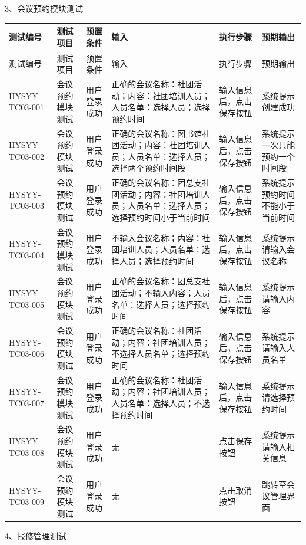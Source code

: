 \documentclass{izdthesis}
\begin{document}
3、会议预约模块测试

{\songti
\begin{longtable}{|p{2.3cm}|p{1.8cm}|p{1.9cm}|p{3.2cm}|p{2.1cm}|p{2.3cm}|}
  \hline
  测试编号 & 测试项目 & 预置条件 & 输入 & 执行步骤 & 预期输出 \\
  \hline
  \endfirsthead
  \hline
  测试编号 & 测试项目 & 预置条件 & 输入 & 执行步骤 & 预期输出 \\
  \hline
  \endhead
  HYSYY-TC03-001 & 会议预约模块测试 & 用户登录成功 & 正确的会议名称：社团活动；内容：社团培训人员；人员名单：选择人员；选择预约时间 & 输入信息后，点击保存按钮 & 系统提示创建成功 \\
  \hline
  HYSYY-TC03-002 & 会议预约模块测试 & 用户登录成功 & 正确的会议名称：图书馆社团活动；内容：社团培训人员；人员名单：选择人员；选择两个预约时间段 & 输入信息后，点击保存按钮 & 系统提示一次只能预约一个时间段 \\
  \hline
  HYSYY-TC03-003 & 会议预约模块测试 & 用户登录成功 & 正确的会议名称：团总支社团活动；内容：社团培训人员；人员名单：选择人员；选择预约时间小于当前时间 & 输入信息后，点击保存按钮 & 系统提示预约时间不能小于当前时间 \\
  \hline
  HYSYY-TC03-004 & 会议预约模块测试 & 用户登录成功 & 不输入会议名称；内容：社团培训人员；人员名单：选择人员；选择预约时间 & 输入信息后，点击保存按钮 & 系统提示请输入会议名称 \\
  \hline
  HYSYY-TC03-005 & 会议预约模块测试 & 用户登录成功 & 正确的会议名称：团总支社团活动；不输入内容；人员名单：选择人员；选择预约时间 & 输入信息后，点击保存按钮 & 系统提示请输入内容 \\
  \hline
  HYSYY-TC03-006 & 会议预约模块测试 & 用户登录成功 & 正确的会议名称：社团活动；内容：社团培训人员；不选择人员名单；选择预约时间 & 输入信息后，点击保存按钮 & 系统提示请输入人员名单 \\
  \hline
  HYSYY-TC03-007 & 会议预约模块测试 & 用户登录成功 & 正确的会议名称：社团活动；内容：社团培训人员；人员名单：选择人员；不选择预约时间 & 输入信息后，点击保存按钮 & 系统提示请选择预约时间 \\
  \hline
  HYSYY-TC03-008 & 会议预约模块测试 & 用户登录成功 & 无 & 点击保存按钮 & 系统提示请输入相关信息 \\
  \hline
  HYSYY-TC03-009 & 会议预约模块测试 & 用户登录成功 & 无 & 点击取消按钮 & 跳转至会议管理界面 \\
  \hline
\end{longtable}
}

4、报修管理测试
\end{document}
